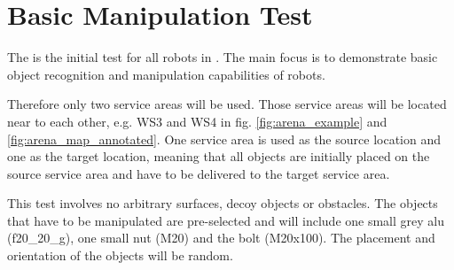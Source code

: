 

\section{Basic Manipulation Test}
\label{sec:Basic Manipulation Test}

The  is the initial test for all robots in \RCAW .
The main focus is to demonstrate basic object recognition and manipulation capabilities of robots.

Therefore only two service areas will be used. Those service areas will be located near to each other, e.g. WS3 and WS4 in fig. \ref{fig:arena_example} and \ref{fig:arena_map_annotated}. One service area is used as the source location and one as the target location, meaning that all objects are initially placed on the source service area and have to be delivered to the target service area.

This test involves no arbitrary surfaces, decoy objects or obstacles.
The objects that have to be manipulated are pre-selected and will include one small grey alu (f20\_20\_g), one small nut (M20) and the bolt (M20x100). The placement and orientation of the objects will be random.



